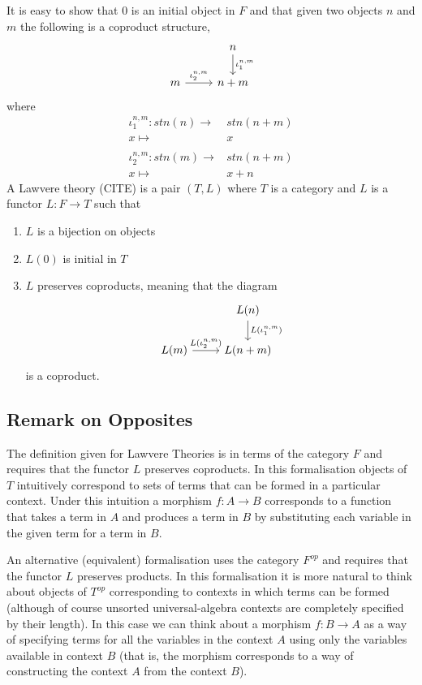It is easy to show that $0$ is an initial object in $F$ and that given two
objects $n$ and $m$ the following is a coproduct structure,
\[
\begin{tikzcd}
    & n\arrow[d, "\iota_1^{n,m}"] \\
    m\arrow[r, "\iota_2^{n,m}"] & n+m
\end{tikzcd}
\]
where
\begin{align*}
    \iota_1^{n,m}:stn(n)\to& stn(n+m) \\
    x\mapsto&x \\
    \\
    \iota_2^{n,m}:stn(m)\to& stn(n+m) \\
    x\mapsto&x+n
\end{align*}
A Lawvere theory (CITE) is a pair $(T, L)$ where $T$ is a category and $L$ is a
functor $L : F \to T$ such that
\begin{enumerate}
    \item $L$ is a bijection on objects
    \item $L(0)$ is initial in $T$
    \item $L$ preserves coproducts, meaning that the diagram
    \[
    \begin{tikzcd}
        & L(n)\arrow[d, "L(\iota_1^{n,m})"] \\
        L(m)\arrow[r, "L(\iota_2^{n,m})"] & L(n+m)
    \end{tikzcd}
    \]
    is a coproduct.
\end{enumerate}

\subsection{Remark on Opposites}
The definition given for Lawvere Theories is in terms of the category $F$ and
requires that the functor $L$ preserves coproducts. In this formalisation
objects of $T$ intuitively correspond to sets of terms that can be formed in a
particular context. Under this intuition a morphism $f:A\to B$ corresponds to a
function that takes a term in $A$ and produces a term in $B$ by substituting
each variable in the given term for a term in $B$.

An alternative (equivalent) formalisation uses the category $F^{op}$ and
requires that the functor $L$ preserves products. In this formalisation it
is more natural to think about objects of $T^{op}$ corresponding to contexts in
which terms can be formed (although of course unsorted universal-algebra
contexts are completely specified by their length). In this case we can think
about a morphism $f:B\to A$ as a way of specifying terms for all the variables
in the context $A$ using only the variables available in context $B$ (that is,
the morphism corresponds to a way of constructing the context $A$ from the
context $B$). 

